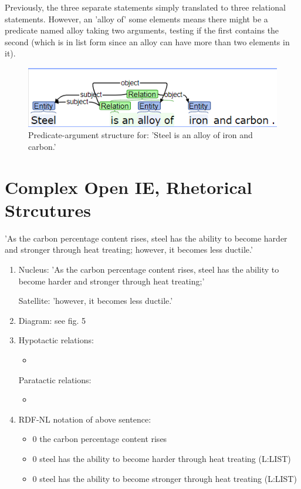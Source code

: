 \documentclass[12pt]{report}
\begin{document}
\begin{enumerate}
    Previously, the three separate statements simply translated to three
    relational statements. However, an 'alloy of' some elements means there
    might be a predicate named alloy taking two arguments, testing if the first
    contains the second (which is in list form since an alloy can have more
    than two elements in it).\par
  \begin{figure}[ht]
    \includegraphics[width=\linewidth]{task4pas.PNG}
    \caption{Predicate-argument structure for: 'Steel is an alloy of iron and
    carbon.'}
    \label{PAStruct}
  \end{figure}
\end{enumerate}

\section{Complex Open IE, Rhetorical Strcutures}
'As the carbon percentage content rises, steel has the ability to become harder
and stronger through heat treating; however, it becomes less ductile.'
\begin{enumerate}
  \item Nucleus: 'As the carbon percentage content rises, steel has the ability
  to become harder and stronger through heat treating;'\par
  Satellite: 'however, it becomes less ductile.'
  \item Diagram: see fig. 5
  \item Hypotactic relations:
  \begin{itemize}
    \item
  \end{itemize}
  Paratactic relations:
  \begin{itemize}
    \item
  \end{itemize}
  \item RDF-NL notation of above sentence:\par
  \begin{itemize}
    \item 0 the carbon percentage content   rises
    \item 0 steel   has the ability   to become harder through heat treating
    (L:LIST)
    \item 0 steel   has the ability   to become stronger through heat treating
    (L:LIST)
  \end{itemize}
\end{enumerate}
\end{document}
